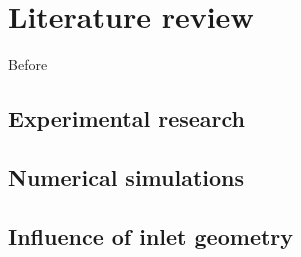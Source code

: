 \chapter{Literature review} \label{cap:liter}

\noindent Before 

\section{Experimental research} %
\section{Numerical simulations} %
\section{Influence of inlet geometry} %